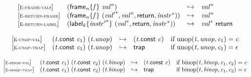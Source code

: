 \vspace{1ex}

$$
\begin{array}{@{}l@{}lcl@{}l@{}}
{[\textsc{\scriptsize E{-}frame{-}vals}]} \quad & ({{\mathsf{frame}}_{{\mathit{n}}}}{\{{\mathit{f}}\}}~{{\mathit{val}}^{{\mathit{n}}}}) &\hookrightarrow& {{\mathit{val}}^{{\mathit{n}}}} &  \\
{[\textsc{\scriptsize E{-}return{-}frame}]} \quad & ({{\mathsf{frame}}_{{\mathit{n}}}}{\{{\mathit{f}}\}}~({{\mathit{val}'}^\ast}, {{\mathit{val}}^{{\mathit{n}}}}, \mathsf{return}, {{\mathit{instr}}^\ast})) &\hookrightarrow& {{\mathit{val}}^{{\mathit{n}}}} &  \\
{[\textsc{\scriptsize E{-}return{-}label}]} \quad & ({{\mathsf{label}}_{{\mathit{k}}}}{\{{{\mathit{instr}'}^\ast}\}}~({{\mathit{val}}^\ast}, \mathsf{return}, {{\mathit{instr}}^\ast})) &\hookrightarrow& {{\mathit{val}}^\ast}~\mathsf{return} &  \\
\end{array}
$$

\vspace{1ex}

$$
\begin{array}{@{}l@{}lcl@{}l@{}}
{[\textsc{\scriptsize E{-}unop{-}val}]} \quad & ({\mathit{t}}.\mathsf{const}~{\mathit{c}}_{{1}})~({\mathit{t}} . {\mathit{unop}}) &\hookrightarrow& ({\mathit{t}}.\mathsf{const}~{\mathit{c}}) &\quad
  \mbox{if}~{\mathrm{unop}}({\mathit{t}}, {\mathit{unop}}, {\mathit{c}}_{{1}}) = {\mathit{c}} \\
{[\textsc{\scriptsize E{-}unop{-}trap}]} \quad & ({\mathit{t}}.\mathsf{const}~{\mathit{c}}_{{1}})~({\mathit{t}} . {\mathit{unop}}) &\hookrightarrow& \mathsf{trap} &\quad
  \mbox{if}~{\mathrm{unop}}({\mathit{t}}, {\mathit{unop}}, {\mathit{c}}_{{1}}) = \epsilon \\
\end{array}
$$

\vspace{1ex}

$$
\begin{array}{@{}l@{}lcl@{}l@{}}
{[\textsc{\scriptsize E{-}binop{-}val}]} \quad & ({\mathit{t}}.\mathsf{const}~{\mathit{c}}_{{1}})~({\mathit{t}}.\mathsf{const}~{\mathit{c}}_{{2}})~({\mathit{t}} . {\mathit{binop}}) &\hookrightarrow& ({\mathit{t}}.\mathsf{const}~{\mathit{c}}) &\quad
  \mbox{if}~{\mathrm{binop}}({\mathit{t}}, {\mathit{binop}}, {\mathit{c}}_{{1}}, {\mathit{c}}_{{2}}) = {\mathit{c}} \\
{[\textsc{\scriptsize E{-}binop{-}trap}]} \quad & ({\mathit{t}}.\mathsf{const}~{\mathit{c}}_{{1}})~({\mathit{t}}.\mathsf{const}~{\mathit{c}}_{{2}})~({\mathit{t}} . {\mathit{binop}}) &\hookrightarrow& \mathsf{trap} &\quad
  \mbox{if}~{\mathrm{binop}}({\mathit{t}}, {\mathit{binop}}, {\mathit{c}}_{{1}}, {\mathit{c}}_{{2}}) = \epsilon \\
\end{array}
$$

